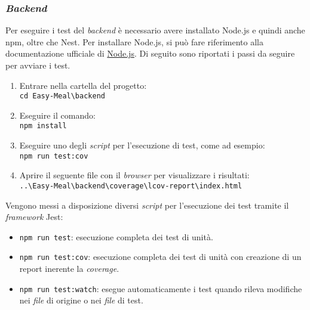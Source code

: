 \subsubsection{\textit{Backend}}
Per eseguire i test del \textit{backend} è necessario avere installato Node.js e quindi anche npm, oltre che Nest. 
Per installare Node.js, si può fare riferimento alla documentazione ufficiale di \href{https://nodejs.org/en/download/package-manager}{Node.js}. 
Di seguito sono riportati i passi da seguire per avviare i test.
\begin{enumerate}
	\item Entrare nella cartella del progetto: \\
		\texttt{cd Easy-Meal\textbackslash backend}
	\item Eseguire il comando: \\
		\texttt{npm install}
	\item Eseguire uno degli \textit{script} per l'esecuzione di test, come ad esempio: \\
		\texttt{npm run test:cov}
	\item Aprire il seguente file con il \textit{browser} per visualizzare i risultati: \\
		\texttt{..\textbackslash Easy-Meal\textbackslash backend\textbackslash coverage\textbackslash lcov-report\textbackslash index.html}
\end{enumerate}
Vengono messi a disposizione diversi \textit{script} per l'esecuzione dei test tramite il \textit{framework} Jest:
\begin{itemize}
	\item \texttt{npm run test}: esecuzione completa dei test di unità.
	\item \texttt{npm run test:cov}: esecuzione completa dei test di unità con creazione di un report inerente la \textit{coverage}.
	\item \texttt{npm run test:watch}: esegue automaticamente i test quando rileva modifiche nei \textit{file} di origine o nei \textit{file} di test.
\end{itemize}

